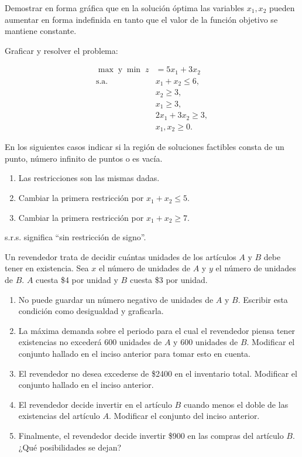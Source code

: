 \begin{Ejer}
\begin{Ejer}
Demostrar en forma gr\'afica que en la soluci\'on \'optima las variables $x_1, x_2$ pueden aumentar en forma indefinida en tanto que el valor de la funci\'on objetivo se mantiene constante.
\end{Ejer}



\begin{Ejer}
Graficar y resolver el problema:

\[
\begin{aligned}
\max \; \text{y} \; \min \; z &= 5x_1 + 3x_2 \\
\text{s.a.} \quad
& x_1 + x_2 \leq 6, \\
& x_2 \geq 3, \\
& x_1 \geq 3, \\
& 2x_1 + 3x_2 \geq 3, \\
& x_1, x_2 \geq 0.
\end{aligned}
\]

En los siguientes casos indicar si la regi\'on de soluciones factibles consta de un punto, n\'umero infinito de puntos o es vac\'ia.

\begin{enumerate}
\item Las restricciones son las mismas dadas.
\item Cambiar la primera restricci\'on por $x_1 + x_2 \leq 5$.
\item Cambiar la primera restricci\'on por $x_1 + x_2 \geq 7$.
\end{enumerate}

\footnotesize{s.r.s. significa ``sin restricci\'on de signo''.}
\end{Ejer}




\begin{Ejer} Un revendedor trata de decidir cu\'antas unidades de los art\'iculos $A$ y $B$ debe tener en existencia. Sea $x$ el n\'umero de unidades de $A$ y $y$ el n\'umero de unidades de $B$.  
$A$ cuesta \$4 por unidad y $B$ cuesta \$3 por unidad.

\begin{enumerate}
\item[a)] No puede guardar un n\'umero negativo de unidades de $A$ y $B$. Escribir esta condici\'on como desigualdad y graficarla.
\item[b)] La m\'axima demanda sobre el periodo para el cual el revendedor piensa tener existencias no exceder\'a 600 unidades de $A$ y 600 unidades de $B$. Modificar el conjunto hallado en el inciso anterior para tomar esto en cuenta.
\item[c)] El revendedor no desea excederse de \$2400 en el inventario total. Modificar el conjunto hallado en el inciso anterior.
\item[d)] El revendedor decide invertir en el art\'iculo $B$ cuando menos el doble de las existencias del art\'iculo $A$. Modificar el conjunto del inciso anterior.
\item[e)] Finalmente, el revendedor decide invertir \$900 en las compras del art\'iculo $B$. ¿Qu\'e posibilidades se dejan?
\end{enumerate}
\end{Ejer}



\end{Ejer}
